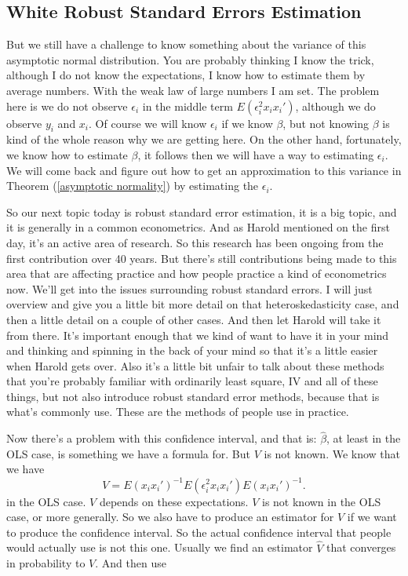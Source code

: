 \documentclass[11pt,a4paper]{amsart}
\theoremstyle{plain}
\theoremstyle{definition}
\begin{document}
\subsection{White Robust Standard Errors Estimation} 	
  		But we still have a challenge to know something about the variance of this asymptotic normal distribution. You are probably thinking I know the trick, although I do not know the expectations, I know how to estimate them by average numbers. With the weak law of large numbers I am set. The problem here is we do not observe $\epsilon_{i}$ in the middle term $E(\epsilon_{i}^{2}x_{i}x_{i}')$, although we do observe $y_{i}$ and $x_{i}$. Of course we will know $\epsilon_{i}$ if we know $\beta$, but not knowing $\beta$ is kind of the whole reason why we are getting here. On the other hand, fortunately, we know how to estimate $\beta$, it follows then we will have a way to estimating $\epsilon_{i}$. We will come back and figure out how to get an approximation to this variance in Theorem (\ref{asymptotic normality}) by estimating the $\epsilon_{i}$. \par 
  		So our next topic today is robust standard error estimation, it is a big topic, and it is generally in a common econometrics. And as Harold mentioned on the first day, it's an active area of research. So this research has been ongoing from the first contribution over 40 years. But there's still contributions being made to this area that are affecting practice and how people practice a kind of econometrics now. We'll get into the issues surrounding robust standard errors. I will just overview and give you a little bit more detail on that heteroskedasticity case, and then a little detail on a couple of other cases. And then let Harold will take it from there. It's important enough that we kind of want to have it in your mind and thinking and spinning in the back of your mind so that it's a little easier when Harold gets over. Also it's a little bit unfair to  talk about these methods that you're probably familiar with ordinarily least square, IV and all of these things, but not also introduce robust standard error methods, because that is what's commonly use. These are the methods of people use in practice.\par 
		 Now there's a problem with this confidence interval, and that is: $\hat{\beta}$, at least in the OLS case, is something we have a formula for. But $V$ is not known. We know that we have 
		 \[	V = E(x_{i}x_{i}')^{-1}E(\epsilon_{i}^{2}x_{i}x_{i}')E(x_{i}x_{i}')^{-1}.	\]
		 in the OLS case. $V$ depends on these expectations. $V$ is not known in the OLS case, or more generally. So we also have to produce an estimator for $V$ if we want to produce the confidence interval. So the actual confidence interval that people would actually use is not this one. Usually we find an estimator $\hat{V}$ that converges in probability to $V$. And then use 
\end{document}
